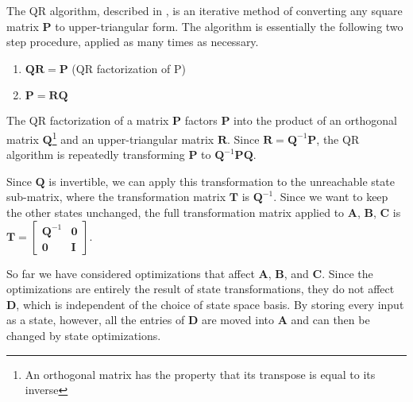 The QR algorithm, described in \cite{Trefethen}, is an iterative method of
converting any square matrix $\mathbf{P}$ to upper-triangular
form. The algorithm is essentially the following two step
procedure, applied as many times as necessary.
\begin{enumerate}
\vspace{\itemshrink} \item $\mathbf{Q} \mathbf{R} = \mathbf{P}$   (QR factorization of
P)

\vspace{\itemshrink} \item $\mathbf{P} = \mathbf{R} \mathbf{Q}$
\vspace{\itemshrink} \end{enumerate}

The QR factorization of a matrix $\mathbf{P}$ factors $\mathbf{P}$
into the product of an orthogonal matrix $\mathbf{Q}$\footnote{An
orthogonal matrix has the property that its transpose is equal to its
inverse} and an upper-triangular matrix $\mathbf{R}$. Since
$\mathbf{R} = \mathbf{Q}^{-1}
\mathbf{P}$, the QR algorithm is repeatedly transforming
$\mathbf{P}$ to $\mathbf{Q}^{-1} \mathbf{P} \mathbf{Q}$.

Since $\mathbf{Q}$ is invertible, we can apply this
transformation to the unreachable state sub-matrix, where the
transformation matrix $\mathbf{T}$ is $\mathbf{Q}^{-1}$. Since we
want to keep the other states unchanged, the full transformation
matrix applied to $\mathbf{A}$, $\mathbf{B}$, $\mathbf{C}$ is
$\mathbf{T} = \left [ \begin{array} {cc} \mathbf{Q}^{-1} &
\mathbf{0} \\ \mathbf{0} & \mathbf{I} \end{array} \right ]$.


So far we have considered optimizations that affect $\mathbf{A}$,
$\mathbf{B}$, and $\mathbf{C}$. Since the optimizations are entirely
the result of state transformations, they do not affect $\mathbf{D}$,
which is independent of the choice of state space basis. By storing
every input as a state, however, all the entries of $\mathbf{D}$ are
moved into $\mathbf{A}$ and can then be changed by state
optimizations.

